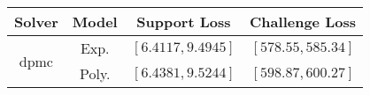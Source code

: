 \begin{tabular}{cc|c|c} 
\hline 
 Solver & Model & Support Loss  & Challenge Loss \tabularnewline\hline 
\hline 
\multirow{2}{*}{dpmc} & Exp. & $\mathbf{\left[6.4117,9.4945\right]}$ & $\mathbf{\left[578.55,585.34\right]}$ \tabularnewline 
 & Poly. & $\left[6.4381,9.5244\right]$ & $\left[598.87,600.27\right]$ \tabularnewline 
\hline 
\end{tabular} 

